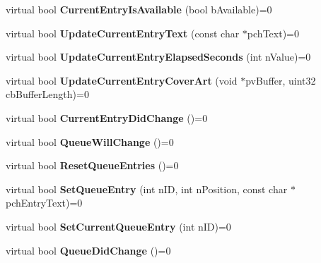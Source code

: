 \begin{DoxyCompactItemize}
virtual bool {\bfseries Current\+Entry\+Is\+Available} (bool b\+Available)=0
\item 
\mbox{\label{class_i_steam_music_remote_ad2bf0215a5af5fcb912fd7cc22fa04f9}} 
virtual bool {\bfseries Update\+Current\+Entry\+Text} (const char $\ast$pch\+Text)=0
\item 
\mbox{\label{class_i_steam_music_remote_a493371400c91a982929bf518f39f49db}} 
virtual bool {\bfseries Update\+Current\+Entry\+Elapsed\+Seconds} (int n\+Value)=0
\item 
\mbox{\label{class_i_steam_music_remote_a4ee4b88daf939894a8f470d289e60579}} 
virtual bool {\bfseries Update\+Current\+Entry\+Cover\+Art} (void $\ast$pv\+Buffer, uint32 cb\+Buffer\+Length)=0
\item 
\mbox{\label{class_i_steam_music_remote_abd66e7e611456456c4bee2b4768b1393}} 
virtual bool {\bfseries Current\+Entry\+Did\+Change} ()=0
\item 
\mbox{\label{class_i_steam_music_remote_a10c849a7d48e5b3054b9d996e18e585b}} 
virtual bool {\bfseries Queue\+Will\+Change} ()=0
\item 
\mbox{\label{class_i_steam_music_remote_a738bf3d6be02b09a445081de31687033}} 
virtual bool {\bfseries Reset\+Queue\+Entries} ()=0
\item 
\mbox{\label{class_i_steam_music_remote_a544a9fdf6761151e7a04fd378c096b33}} 
virtual bool {\bfseries Set\+Queue\+Entry} (int n\+ID, int n\+Position, const char $\ast$pch\+Entry\+Text)=0
\item 
\mbox{\label{class_i_steam_music_remote_af2158b129431d957a6d53845580385c6}} 
virtual bool {\bfseries Set\+Current\+Queue\+Entry} (int n\+ID)=0
\item 
\mbox{\label{class_i_steam_music_remote_abf68a2815d0b117224749cb9cb7d2634}} 
virtual bool {\bfseries Queue\+Did\+Change} ()=0
\item 
\mbox{\label{class_i_steam_music_remote_ac61f8bcdcba0ce5648eda9b20022c4be}} 

\end{DoxyCompactItemize}
